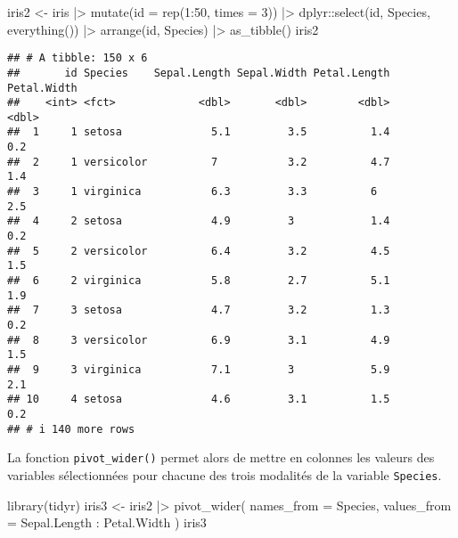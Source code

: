 \documentclass[
]{book}
\newenvironment{Shaded}{\begin{snugshade}}{\end{snugshade}}
\newcommand{\AttributeTok}[1]{\textcolor[rgb]{0.77,0.63,0.00}{#1}}
\newcommand{\DecValTok}[1]{\textcolor[rgb]{0.00,0.00,0.81}{#1}}
\newcommand{\FunctionTok}[1]{\textcolor[rgb]{0.00,0.00,0.00}{#1}}
\newcommand{\NormalTok}[1]{#1}
\newcommand{\OtherTok}[1]{\textcolor[rgb]{0.56,0.35,0.01}{#1}}
\newcommand{\SpecialCharTok}[1]{\textcolor[rgb]{0.00,0.00,0.00}{#1}}
\begin{document}
\begin{Shaded}
\begin{Highlighting}[]
\NormalTok{iris2 }\OtherTok{\textless{}{-}}
\NormalTok{  iris }\SpecialCharTok{|\textgreater{}}
  \FunctionTok{mutate}\NormalTok{(}\AttributeTok{id =} \FunctionTok{rep}\NormalTok{(}\DecValTok{1}\SpecialCharTok{:}\DecValTok{50}\NormalTok{, }\AttributeTok{times =} \DecValTok{3}\NormalTok{)) }\SpecialCharTok{|\textgreater{}}
\NormalTok{  dplyr}\SpecialCharTok{::}\FunctionTok{select}\NormalTok{(id, Species,  }\FunctionTok{everything}\NormalTok{()) }\SpecialCharTok{|\textgreater{}}
  \FunctionTok{arrange}\NormalTok{(id, Species) }\SpecialCharTok{|\textgreater{}}
  \FunctionTok{as\_tibble}\NormalTok{()}
\NormalTok{iris2}
\end{Highlighting}
\end{Shaded}

\begin{verbatim}
## # A tibble: 150 x 6
##       id Species    Sepal.Length Sepal.Width Petal.Length Petal.Width
##    <int> <fct>             <dbl>       <dbl>        <dbl>       <dbl>
##  1     1 setosa              5.1         3.5          1.4         0.2
##  2     1 versicolor          7           3.2          4.7         1.4
##  3     1 virginica           6.3         3.3          6           2.5
##  4     2 setosa              4.9         3            1.4         0.2
##  5     2 versicolor          6.4         3.2          4.5         1.5
##  6     2 virginica           5.8         2.7          5.1         1.9
##  7     3 setosa              4.7         3.2          1.3         0.2
##  8     3 versicolor          6.9         3.1          4.9         1.5
##  9     3 virginica           7.1         3            5.9         2.1
## 10     4 setosa              4.6         3.1          1.5         0.2
## # i 140 more rows
\end{verbatim}

La fonction \texttt{pivot\_wider()} permet alors de mettre en colonnes les valeurs des variables sélectionnées pour chacune des trois modalités de la variable \texttt{Species}.

\begin{Shaded}
\begin{Highlighting}[]
\FunctionTok{library}\NormalTok{(tidyr)}
\NormalTok{iris3 }\OtherTok{\textless{}{-}} 
\NormalTok{  iris2 }\SpecialCharTok{|\textgreater{}} 
  \FunctionTok{pivot\_wider}\NormalTok{(}
    \AttributeTok{names\_from =}\NormalTok{ Species,}
    \AttributeTok{values\_from =}\NormalTok{ Sepal.Length }\SpecialCharTok{:}\NormalTok{ Petal.Width}
\NormalTok{    )}
\NormalTok{iris3}
\end{Highlighting}
\end{Shaded}
\end{document}
